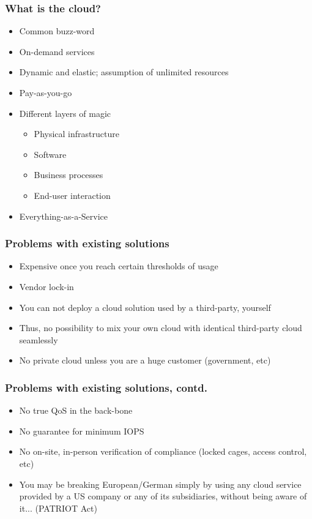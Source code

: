 \documentclass[t]{beamer}
\begin{document}
\begin{frame}
	\frametitle{What is the cloud?}
	\begin{itemize}
		\item Common buzz-word
		\item On-demand services
		\item Dynamic and elastic; assumption of unlimited resources
		\item Pay-as-you-go
		\item Different layers of magic
		\begin{itemize}
			\item Physical infrastructure
			\item Software
			\item Business processes
			\item End-user interaction
		\end{itemize}
		\item Everything-as-a-Service
	\end{itemize}
\end{frame}

\begin{frame}
	\frametitle{Problems with existing solutions}
	\begin{itemize}
		\item Expensive once you reach certain thresholds of usage
		\item Vendor lock-in
		\item You can not deploy a cloud solution used by a third-party, yourself
		\item Thus, no possibility to mix your own cloud with identical third-party cloud seamlessly
		\item No private cloud unless you are a huge customer (government, etc)
	\end{itemize}
\end{frame}

\begin{frame}
	\frametitle{Problems with existing solutions, contd.}
	\begin{itemize}
		\item No true QoS in the back-bone
		\item No guarantee for minimum IOPS
		\item No on-site, in-person verification of compliance (locked cages, access control, etc)
		\item You may be breaking European/German simply by using any cloud service provided by a US company or any of its subsidiaries, without being aware of it... (PATRIOT Act)
	\end{itemize}
\end{frame}
\end{document}
